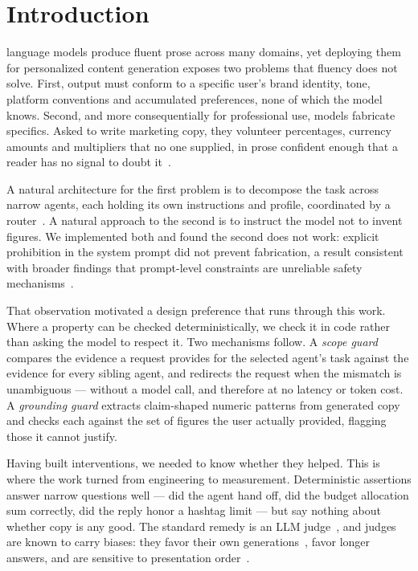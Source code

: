 \documentclass[journal]{IEEEtran}
\begin{document}
\section{Introduction}
 language models produce fluent prose across many
domains, yet deploying them for personalized content generation exposes two
problems that fluency does not solve. First, output must conform to a specific
user's brand identity, tone, platform conventions and accumulated preferences,
none of which the model knows. Second, and more consequentially for
professional use, models fabricate specifics. Asked to write marketing copy,
they volunteer percentages, currency amounts and multipliers that no one
supplied, in prose confident enough that a reader has no signal to doubt
it~\cite{ji2023hallucination}.

A natural architecture for the first problem is to decompose the task across
narrow agents, each holding its own instructions and profile, coordinated by a
router~\cite{wu2023autogen, langgraph2024}. A natural approach to the second is
to instruct the model not to invent figures. We implemented both and found the
second does not work: explicit prohibition in the system prompt did not prevent
fabrication, a result consistent with broader findings that prompt-level
constraints are unreliable safety mechanisms~\cite{rebedea2023nemo}.

That observation motivated a design preference that runs through this work.
Where a property can be checked deterministically, we check it in code rather
than asking the model to respect it. Two mechanisms follow. A \emph{scope
guard} compares the evidence a request provides for the selected agent's task
against the evidence for every sibling agent, and redirects the request when
the mismatch is unambiguous --- without a model call, and therefore at no
latency or token cost. A \emph{grounding guard} extracts claim-shaped numeric
patterns from generated copy and checks each against the set of figures the
user actually provided, flagging those it cannot justify.

Having built interventions, we needed to know whether they helped. This is
where the work turned from engineering to measurement. Deterministic assertions
answer narrow questions well --- did the agent hand off, did the budget
allocation sum correctly, did the reply honor a hashtag limit --- but say
nothing about whether copy is any good. The standard remedy is an LLM
judge~\cite{zheng2023judging, liu2023geval}, and judges are known to carry
biases: they favor their own generations~\cite{panickssery2024selfpref},
favor longer answers, and are sensitive to presentation
order~\cite{wang2023fair, koo2023benchmarking}.
\end{document}
